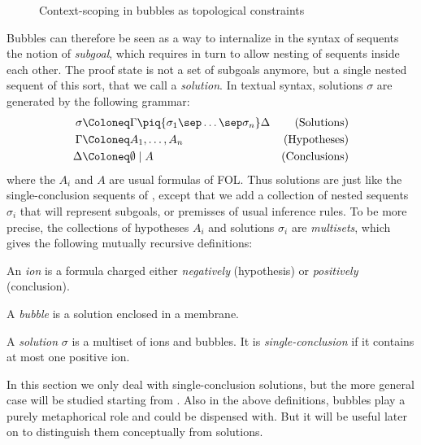 \begin{figure}
  \caption{Context-scoping in bubbles as topological constraints}
\end{figure}

Bubbles can therefore be seen as a way to internalize in the syntax of sequents
the notion of \emph{subgoal}, which requires in turn to allow nesting of
sequents inside each other. The proof state is not a set of subgoals anymore,
but a single nested sequent of this sort, that we call a
\emph{solution}. In textual syntax, solutions $\sigma$ are
generated by the following grammar:
\begin{align*}
  \sigma &\Coloneq \Gamma \piq{\sigma_1 \sep \ldots \sep \sigma_n} \Delta &\text{(Solutions)}
  \\
  \Gamma &\Coloneq A_1, \ldots, A_n &\text{(Hypotheses)}
  \\
  \Delta &\Coloneq \emptyset \mid A &\text{(Conclusions)}
\end{align*}
where the $A_i$ and $A$ are usual formulas of FOL. Thus solutions are just like
the single-conclusion sequents of , except that we add a collection of
nested sequents $\sigma_i$ that will represent subgoals, or premisses of usual
inference rules. To be more precise, the collections of hypotheses $A_i$ and
solutions $\sigma_i$ are \emph{multisets}, which gives the following mutually
recursive definitions:
\begin{definition}[Ion]
  An \emph{ion} is a formula charged either \emph{negatively} (hypothesis) or
  \emph{positively} (conclusion).
\end{definition}
\begin{definition}[Bubble]
  A \emph{bubble} is a solution enclosed in a membrane.
\end{definition}
\begin{definition}[Solution]
  A \emph{solution} $\sigma$ is a multiset of ions and bubbles. It is
  \emph{single-conclusion} if it contains at most one positive ion.
\end{definition}
In this section we only deal with single-conclusion solutions, but the more
general case will be studied starting from . Also in the above
definitions, bubbles play a purely metaphorical role and could be dispensed
with. But it will be useful later on to distinguish them conceptually from
solutions.

